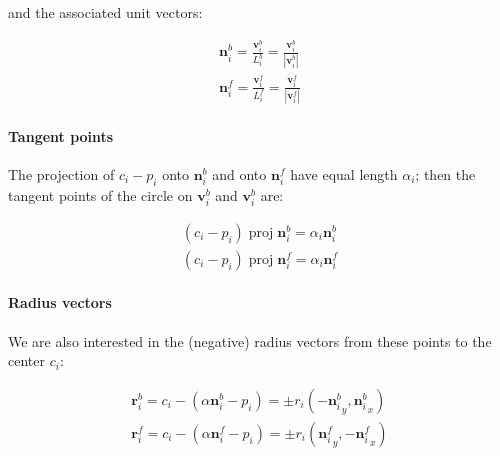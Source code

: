 \documentclass{article}
\begin{document}
and the associated unit vectors:

\begin{equation}
  \label{eq:unit-vectors}
  \begin{split}
    \mathbf{n}^{b}_{i} = \frac{\mathbf{v}^{b}_{i}}{L^{b}_{i}} =\frac{\mathbf{v}^{b}_{i}}{|\mathbf{v}^{b}_{i}|}\\
    \mathbf{n}^{f}_{i} = \frac{\mathbf{v}^{f}_{i}}{L^{f}_{i}} =\frac{\mathbf{v}^{f}_{i}}{|\mathbf{v}^{f}_{i}|}
  \end{split}
\end{equation}

\paragraph{Tangent points}

The projection of $c_{i}-p_{i}$ onto $\mathbf{n}^{b}_{i}$ and onto $\mathbf{n}^{f}_{i}$ have equal length $\alpha_i$; then the tangent points of the circle on $\mathbf{v}^{b}_{i}$ and $\mathbf{v}^{b}_{i}$ are:

\begin{equation}
  \label{eq:alpha-vectors}
  \begin{split}
    (c_{i}-p_{i})\;\mathrm{proj}\; \mathbf{n}^{b}_{i} = \alpha_i\mathbf{n}^{b}_{i}\\
    (c_{i}-p_{i})\;\mathrm{proj}\; \mathbf{n}^{f}_{i} = \alpha_i\mathbf{n}^{f}_{i}
  \end{split}
\end{equation}

\paragraph{Radius vectors}

We are also interested in the (negative) radius vectors from these points to the center $c_{i}$:

\begin{equation}
  \label{eq:radius-vectors}
   \begin{split}
     \mathbf{r}^{b}_{i} = c_{i} - \left(\alpha\mathbf{n}^{b}_{i} - p_{i}\right)=\pm r_i\left( -{\mathbf{n}^{b}_{i}}_{y},  {\mathbf{n}^{b}_{i}}_{x} \right)\\
     \mathbf{r}^{f}_{i} = c_{i} - \left(\alpha\mathbf{n}^{f}_{i} - p_{i}\right)=\pm r_i\left(  {\mathbf{n}^{f}_{i}}_{y}, -{\mathbf{n}^{f}_{i}}_{x} \right)\\
   \end{split}
\end{equation}
\end{document}
